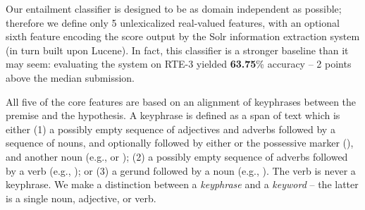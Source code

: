 %
%
Our entailment classifier is designed to be as domain independent as possible;
  therefore we define only 5 unlexicalized real-valued features, with an 
  optional sixth feature encoding the score output by the Solr
  information extraction system (in turn built upon Lucene).
In fact, this classifier is a stronger baseline than it may seem: evaluating
  the system on RTE-3 \cite{key:2007giampiccolo-rte} yielded \textbf{63.75}\% accuracy --
  2 points above the median submission.

All five of the core features are based on an alignment of keyphrases between the
  premise and the hypothesis.
A keyphrase is defined as a span of text which is either
  (1) a possibly empty sequence of adjectives and adverbs followed by a 
      sequence of nouns, and optionally followed by either  or the possessive
      marker (), and another noun (e.g.,  or );
  (2) a possibly empty sequence of adverbs followed by a verb (e.g.,
      ); or
  (3) a gerund followed by a noun (e.g., ).
The verb  is never a keyphrase.
We make a distinction between a \textit{keyphrase} and a \textit{keyword} --
  the latter is a single noun, adjective, or verb.


